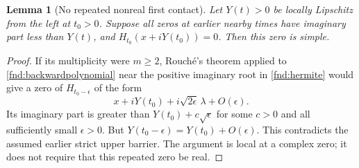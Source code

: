 \documentclass[11pt,a4paper]{article}
\newtheorem{lemma}[theorem]{Lemma}
\theoremstyle{definition}
\theoremstyle{remark}
\begin{document}
\begin{lemma}[No repeated nonreal first contact]\label{fnd:multiple}
Let $Y(t)>0$ be locally Lipschitz from the left at $t_0>0$. Suppose
all zeros at earlier nearby times have imaginary part less than $Y(t)$,
and $H_{t_0}(x+iY(t_0))=0$. Then this zero is simple.
\end{lemma}
\begin{proof}
If its multiplicity were $m\geq2$, Rouch\'e's theorem applied to
\eqref{fnd:backwardpolynomial} near the positive imaginary root in
\eqref{fnd:hermite} would give a zero of $H_{t_0-\epsilon}$ of the form
\[
 x+iY(t_0)+i\sqrt{2\epsilon}\,\lambda+O(\epsilon).
\]
Its imaginary part is greater than $Y(t_0)+c\sqrt\epsilon$ for some
$c>0$ and all sufficiently small $\epsilon>0$. But
$Y(t_0-\epsilon)=Y(t_0)+O(\epsilon)$. This contradicts the assumed
earlier strict upper barrier. The argument is local at a complex zero;
it does not require that this repeated zero be real.
\end{proof}
\end{document}
